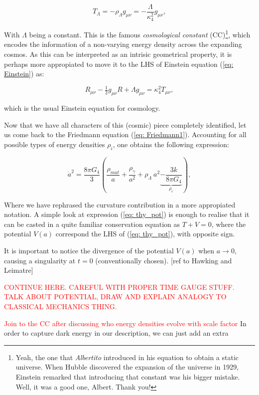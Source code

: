 \documentclass[11pt, a4paper]{article} %
\begin{document}
\begin{equation}
	T_{\Lambda} = - \rho_{\Lambda}g_{\mu\nu} = - \frac{\Lambda}{\kappa^{2}_{4}} g_{\mu\nu},
\end{equation}

With $\Lambda$ being a constant. This is the famous \textit{cosmological constant} (CC)\footnote{Yeah, the one that \textit{Albertito} introduced in his equation to obtain a static universe. When Hubble discovered the expansion of the universe in 1929, Einstein remarked that introducing that constant was his bigger mistake. Well, it was a good one, Albert. Thank you!}, which encodes the information of a non-varying energy density across the expanding cosmos. As this can be interpreted as an intrisic geometrical property, it is perhaps more appropiated to move it to the LHS of Einstein equation (\ref{eq: Einstein}) as: 

\begin{equation}\label{eq: Einstein with Lambda}
	R_{\mu\nu} - \tfrac{1}{2} g_{\mu\nu} R + \Lambda g_{\mu\nu}  = \kappa^{2}_{4} T_{\mu \nu},
\end{equation}

which is the usual Einstein equation for cosmology. 

Now that we have all characters of this (cosmic) piece completely identified, let us come back to the Friedmann equation (\ref{eq: Friedmann1}). Accounting for all possible types of energy densities $\rho_{i}$, one obtains the following expression:

\begin{equation}\label{eq: thy_pot}
	\dot{a}^{2} = \frac{8 \pi G_{4}}{3} \left(\frac{\rho_{mat}}{a} + \frac{\rho_{\gamma}}{a^{2}} + \rho_{\Lambda} \:a^{2}\underbrace{- \frac{3 k}{8 \pi G_{4}}}_{\rho_{c}}\right),
\end{equation}

Where we have rephrased the curvature contribution in a more appropiated notation. A simple look at expression (\ref{eq: thy_pot}) is enough to realise that it can be casted in a quite familiar conservation equation as $T + V = 0$, where the potential $V(a)$ correspond the LHS of (\ref{eq: thy_pot}), with opposite sign.

It is important to notice the divergence of the potential $V(a)$ when $a \rightarrow 0$, causing a singularity at $t=0$ (conventionally chosen). [ref to Hawking and Leimatre]

\textcolor{red}{CONTINUE HERE. CAREFUL WITH PROPER TIME GAUGE STUFF. TALK ABOUT POTENTIAL, DRAW AND EXPLAIN ANALOGY TO CLASSICAL MECHANICS THING.}


\textcolor{red}{Join to the CC after discussing who energy densities evolve with scale factor}
In order to capture dark energy in our description, we can just add an extra 





\cite{Danielsson:2018ztv}







\end{document}
